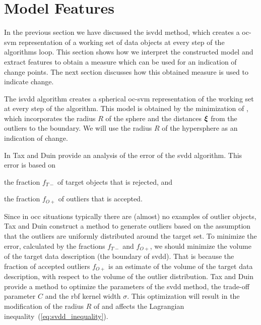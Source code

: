 \section{Model Features}\label{sec:method_model_features}
In the previous section we have discussed the \gls{isvdd} method, which creates a \gls{oc-svm} representation of a working set of data objects at every step of the algorithms loop.
This section shows how we interpret the constructed model and extract features to obtain a measure which can be used for an indication of change points.
The next section discusses how this obtained measure is used to indicate change.

The \gls{isvdd} algorithm creates a spherical \gls{oc-svm} representation of the working set at every step of the algorithm.
This model is obtained by the minimization of , which incorporates the radius $R$ of the sphere and the distances $\vectorsym{\xi}$ from the outliers to the boundary.
We will use the radius $R$ of the hypersphere as an indication of change.

In \cite{tax2002uniform} Tax and Duin provide an analysis of the error of the \gls{svdd} algorithm.
This error is based on
\begin{inparaenum}[\itshape 1\upshape)]
\item the fraction $f_{T-}$ of target objects that is rejected, and
\item the fraction $f_{O+}$ of outliers that is accepted.
\end{inparaenum}
Since in \gls{occ} situations typically there are (almost) no examples of outlier objects, Tax and Duin construct a method to generate outliers based on the assumption that the outliers are uniformly distributed around the target set.
To minimize the error, calculated by the fractions $f_{T-}$ and $f_{O+}$, we should minimize the volume of the target data description (\ie the boundary of \gls{svdd}).
That is because the fraction of accepted outliers $f_{O+}$ is an estimate of the volume of the target data description, with respect to the volume of the outlier distribution.
Tax and Duin provide a method to optimize the parameters of the \gls{svdd} method, \ie the trade-off parameter $C$ and the \gls{rbf} kernel width $\sigma$.
This optimization will result in the modification of the radius $R$ of  and affects the Lagrangian inequality~(\ref{eq:svdd_inequality}).

